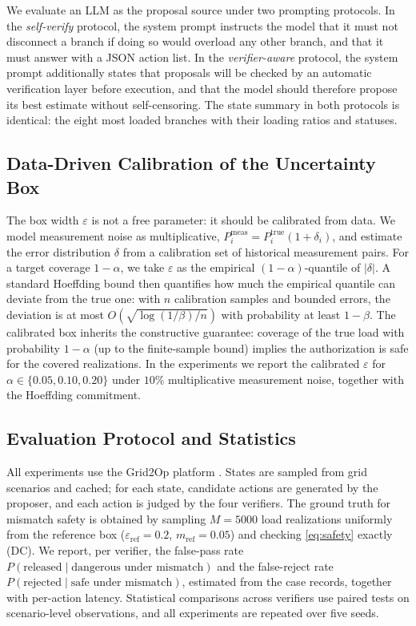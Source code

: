 \documentclass[11pt,a4paper]{article}
\begin{document}
We evaluate an LLM as the proposal source under two prompting protocols.
In the \emph{self-verify} protocol, the system prompt instructs the model that
it must not disconnect a branch if doing so would overload any other branch, and
that it must answer with a JSON action list. In the \emph{verifier-aware}
protocol, the system prompt additionally states that proposals will be checked
by an automatic verification layer before execution, and that the model should
therefore propose its best estimate without self-censoring. The state summary in
both protocols is identical: the eight most loaded branches with their loading
ratios and statuses.

\subsection{Data-Driven Calibration of the Uncertainty Box}
\label{sec:calibration}

The box width $\varepsilon$ is not a free parameter: it should be calibrated
from data. We model measurement noise as multiplicative,
$P^{\text{meas}}_i = P^{\text{true}}_i(1+\delta_i)$, and estimate the error
distribution $\delta$ from a calibration set of historical measurement pairs.
For a target coverage $1-\alpha$, we take $\varepsilon$ as the empirical
$(1-\alpha)$-quantile of $|\delta|$. A standard Hoeffding bound then quantifies
how much the empirical quantile can deviate from the true one: with $n$
calibration samples and bounded errors, the deviation is at most
$O(\sqrt{\log(1/\beta)/n})$ with probability at least $1-\beta$. The
calibrated box inherits the constructive guarantee: coverage of the true load
with probability $1-\alpha$ (up to the finite-sample bound) implies the
authorization is safe for the covered realizations. In the experiments we
report the calibrated $\varepsilon$ for $\alpha \in \{0.05, 0.10, 0.20\}$
under $10\%$ multiplicative measurement noise, together with the Hoeffding
commitment.

\subsection{Evaluation Protocol and Statistics}
\label{sec:evalproto}

All experiments use the Grid2Op platform \cite{grid2op2025}. States are sampled
from grid scenarios and cached; for each state, candidate actions are generated
by the proposer, and each action is judged by the four verifiers. The ground truth for mismatch safety is obtained by sampling
$M = 5000$ load realizations uniformly from the reference box
($\varepsilon_{\text{ref}} = 0.2$, $m_{\text{ref}} = 0.05$) and checking
\eqref{eq:safety} exactly (DC). We report, per verifier, the false-pass rate
$P(\text{released} \mid \text{dangerous under mismatch})$ and the false-reject
rate $P(\text{rejected} \mid \text{safe under mismatch})$, estimated from the
case records, together with per-action latency. Statistical comparisons across
verifiers use paired tests on scenario-level observations, and all experiments
are repeated over five seeds.
\end{document}
